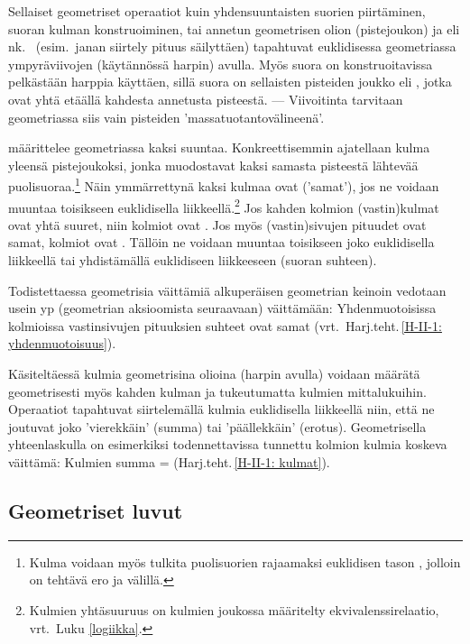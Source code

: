 Sellaiset geometriset operaatiot kuin yhdensuuntaisten suorien piirtäminen, suoran kulman
konstruoiminen, tai annetun geometrisen olion (pistejoukon)  ja 
eli nk.\   (esim.\ janan siirtely pituus säilyttäen) tapahtuvat
euklidisessa geometriassa ympyräviivojen (käytännössä harpin) avulla. Myös suora on 
konstruoitavissa pelkästään harppia käyttäen, sillä suora on sellaisten pisteiden joukko
eli , jotka ovat yhtä etäällä kahdesta annetusta pisteestä. --- Viivoitinta 
tarvitaan geometriassa siis vain pisteiden 'massatuotantovälineenä'. 

 määrittelee geometriassa kaksi suuntaa. Konkreettisemmin ajatellaan kulma
yleensä pistejoukoksi, jonka muodostavat kaksi samasta pisteestä lähtevää
puolisuoraa.\footnote[2]{Kulma voidaan myös tulkita puolisuorien rajaamaksi euklidisen
tason , jolloin on tehtävä ero  ja  välillä.}
Näin ymmärrettynä kaksi kulmaa ovat  ('samat'),
jos ne voidaan muuntaa toisikseen euklidisella liikkeellä.\footnote[3]{Kulmien
yhtäsuuruus on kulmien joukossa määritelty ekvivalenssirelaatio, vrt.\ Luku \ref{logiikka}.} 
Jos kahden kolmion (vastin)kulmat ovat yhtä suuret, niin kolmiot ovat .
Jos myös (vastin)sivujen pituudet ovat samat, kolmiot ovat . Tällöin ne
voidaan muuntaa toisikseen joko euklidisella liikkeellä tai yhdistämällä euklidiseen
liikkeeseen  (suoran suhteen).

Todistettaessa geometrisia väittämiä alkuperäisen geometrian keinoin vedotaan usein
yp (geometrian aksioomista seuraavaan) väittämään:
Yhdenmuotoisissa kolmioissa vastinsivujen pituuksien suhteet ovat samat 
(vrt.\ Harj.teht.\,\ref{H-II-1: yhdenmuotoisuus}). 

Käsiteltäessä kulmia geometrisina olioina (harpin avulla) voidaan määrätä geometrisesti
myös kahden kulman  ja  tukeutumatta kulmien mittalukuihin.
Operaatiot tapahtuvat siirtelemällä kulmia euklidisella liikkeellä niin, että ne joutuvat
joko 'vierekkäin' (summa) tai 'päällekkäin' (erotus). Geometrisella yhteenlaskulla on
esimerkiksi todennettavissa tunnettu kolmion kulmia koskeva väittämä: Kulmien summa = 
 (Harj.teht.\,\ref{H-II-1: kulmat}).

\subsection*{Geometriset luvut}

